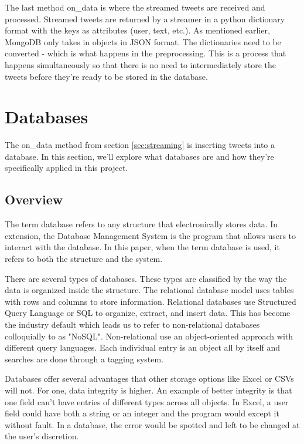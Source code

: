 \documentclass[11pt, twoside, reqno]{book}
\begin{document}
The last method on\_data is where the streamed tweets are received and processed.  Streamed tweets are returned by a streamer in a python dictionary format with the keys as attributes (user, text, etc.). As mentioned earlier, MongoDB only takes in objects in JSON format. The dictionaries need to be converted - which is what happens in the preprocessing.  This is a process that happens simultaneously so that there is no need to intermediately store the tweets before they're ready to be stored in the database. 

\section{Databases}
\hspace{0.2in} The on\_data method from section \ref{sec:streaming} is inserting tweets into a database. In this section, we'll explore what databases are and how they're specifically applied in this project.
\subsection{Overview}
The term database refers to any structure that electronically stores data. In extension, the Database Management System is the program that allows users to interact with the database. In this paper, when the term database is used, it refers to both the structure and the system. 

There are several types of databases. These types are classified by the way the data is organized inside the structure. The relational database model uses tables with rows and columns to store information. Relational databases use Structured Query Language or SQL to organize, extract, and insert data. This has become the industry default which leads us to refer to non-relational databases colloquially to as "NoSQL". Non-relational use an object-oriented approach with different query languages. Each individual entry is an object all by itself and searches are done through a tagging system\cite{connolly_begg_2014}. 

Databases offer several advantages that other storage options like Excel or CSVs will not. For one, data integrity is higher. An example of better integrity is that one field can't have entries of different types across all objects\cite{connolly_begg_2014}. In Excel, a user field could have both a string or an integer and the program would except it without fault. In a database, the error would be spotted and left to be changed at the user's discretion.
\end{document}
